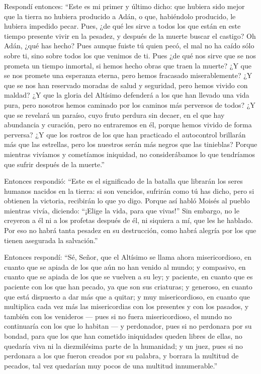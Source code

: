  Respondí entonces: ``Este es mi primer y último dicho:
que hubiera sido mejor que la tierra no hubiera producido a Adán, o que,
habiéndolo producido, le hubiera impedido pecar.  Pues,
¿de qué les sirve a todos los que están en este tiempo presente vivir en
la pesadez, y después de la muerte buscar el castigo? 
Oh Adán, ¿qué has hecho? Pues aunque fuiste tú quien pecó, el mal no ha
caído sólo sobre ti, sino sobre todos los que venimos de ti.
 Pues ¿de qué nos sirve que se nos prometa un tiempo
inmortal, si hemos hecho obras que traen la muerte?  ¿Y
que se nos promete una esperanza eterna, pero hemos fracasado
miserablemente?  ¿Y que se nos han reservado moradas de
salud y seguridad, pero hemos vivido con maldad?  ¿Y que
la gloria del Altísimo defenderá a los que han llevado una vida pura,
pero nosotros hemos caminado por los caminos más perversos de todos?
 ¿Y que se revelará un paraíso, cuyo fruto perdura sin
decaer, en el que hay abundancia y curación, pero no entraremos en él,
 porque hemos vivido de forma perversa? 
¿Y que los rostros de los que han practicado el autocontrol brillarán
más que las estrellas, pero los nuestros serán más negros que las
tinieblas?  Porque mientras vivíamos y cometíamos
iniquidad, no considerábamos lo que tendríamos que sufrir después de la
muerte.''

 Entonces respondió: ``Este es el significado de la
batalla que librarán los seres humanos nacidos en la tierra:
 si son vencidos, sufrirán como tú has dicho, pero si
obtienen la victoria, recibirán lo que yo digo.  Porque
así habló Moisés al pueblo mientras vivía, diciendo: ``¡Elige la vida,
para que vivas!''  Sin embargo, no le creyeron a él ni a
los profetas después de él, ni siquiera a mí, que les he hablado.
 Por eso no habrá tanta pesadez en su destrucción, como
habrá alegría por los que tienen asegurada la salvación.''

 Entonces respondí: ``Sé, Señor, que el Altísimo se
llama ahora misericordioso, en cuanto que se apiada de los que aún no
han venido al mundo;  y compasivo, en cuanto que se
apiada de los que se vuelven a su ley;  y paciente, en
cuanto que es paciente con los que han pecado, ya que son sus criaturas;
 y generoso, en cuanto que está dispuesto a dar más que
a quitar;  y muy misericordioso, en cuanto que
multiplica cada vez más las misericordias con los presentes y con los
pasados, y también con los venideros ---  pues si no
fuera misericordioso, el mundo no continuaría con los que lo habitan ---
 y perdonador, pues si no perdonara por su bondad, para
que los que han cometido iniquidades queden libres de ellas, no quedaría
viva ni la diezmilésima parte de la humanidad;  y un
juez, pues si no perdonara a los que fueron creados por su palabra, y
borrara la multitud de pecados,  tal vez quedarían muy
pocos de una multitud innumerable.''


